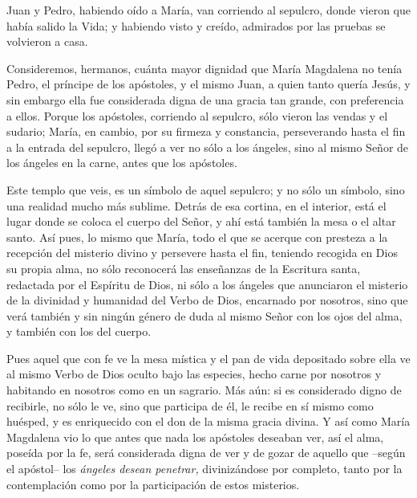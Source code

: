 			\begin{body}Juan y Pedro, habiendo oído a María, van corriendo al sepulcro, donde vieron que había salido la Vida; y habiendo visto y creído, admirados por las pruebas se volvieron a casa.\end{body}
			
			\begin{body}Consideremos, hermanos, cuánta mayor dignidad que María Magdalena no tenía Pedro, el príncipe de los apóstoles, y el mismo Juan, a quien tanto quería Jesús, y sin embargo ella fue considerada digna de una gracia tan grande, con preferencia a ellos. Porque los apóstoles, corriendo al sepulcro, sólo vieron las vendas y el sudario; María, en cambio, por su firmeza y constancia, perseverando hasta el fin a la entrada del sepulcro, llegó a ver no sólo a los ángeles, sino al mismo Señor de los ángeles en la carne, antes que los apóstoles.\end{body}
			
			\begin{body}Este templo que veis, es un símbolo de aquel sepulcro; y no sólo un símbolo, sino una realidad mucho más sublime. Detrás de esa cortina, en el interior, está el lugar donde se coloca el cuerpo del Señor, y ahí está también la mesa o el altar santo. Así pues, lo mismo que María, todo el que se acerque con presteza a la recepción del misterio divino y persevere hasta el fin, teniendo recogida en Dios su propia alma, no sólo reconocerá las enseñanzas de la Escritura santa, redactada por el Espíritu de Dios, ni sólo a los ángeles que anunciaron el misterio de la divinidad y humanidad del Verbo de Dios, encarnado por nosotros, sino que verá también y sin ningún género de duda al mismo Señor con los ojos del alma, y también con los del cuerpo.\end{body}
			
			\begin{body}Pues aquel que con fe ve la mesa mística y el pan de vida depositado sobre ella ve al mismo Verbo de Dios oculto bajo las especies, hecho carne por nosotros y habitando en nosotros como en un sagrario. Más aún: si es considerado digno de recibirle, no sólo le ve, sino que participa de él, le recibe en sí mismo como huésped, y es enriquecido con el don de la misma gracia divina. Y así como María Magdalena vio lo que antes que nada los apóstoles deseaban ver, así el alma, poseída por la fe, será considerada digna de ver y de gozar de aquello que –según el apóstol– los \textit{ángeles desean penetrar, }divinizándose por completo, tanto por la contemplación como por la participación de estos misterios.\end{body}
			
